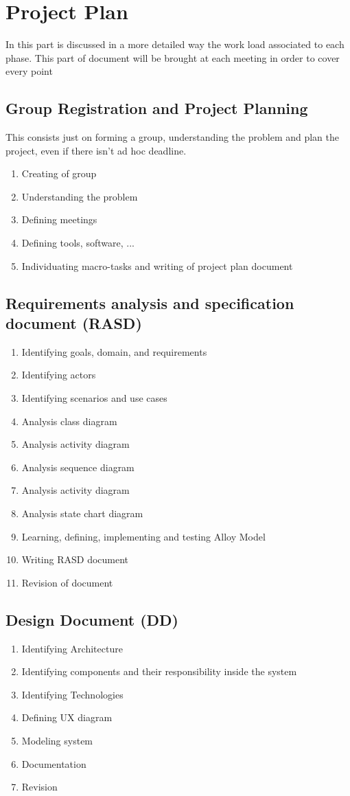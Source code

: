 \documentclass[12pt]{book}
\begin{document}
\chapter{Project Plan }
In this part is discussed in a more detailed way the work load associated to each phase. 
This part of document will be brought at each meeting in order to cover every point
\section{Group Registration and Project Planning}
This consists just on forming a group, understanding the problem and plan the project, even if there isn't ad hoc deadline. 
\begin{enumerate}
	\item Creating of group 
	\item Understanding the problem
	\item Defining meetings
	\item Defining tools, software, ...
	\item Individuating macro-tasks and writing of project plan document
\end{enumerate}
\section{Requirements analysis and specification document (RASD)}
\begin{enumerate}
	\item Identifying goals, domain, and requirements 
	\item Identifying actors
	\item Identifying scenarios and use cases 
	\item Analysis class diagram
	\item Analysis activity diagram
	\item Analysis sequence diagram
	\item Analysis activity diagram
	\item Analysis state chart diagram
	\item Learning, defining, implementing and testing Alloy Model
	\item Writing RASD document
	\item Revision of document
\end{enumerate}
\section{Design Document (DD)}
\begin{enumerate}
	\item Identifying Architecture 
	\item Identifying components and their responsibility inside the system
	\item Identifying Technologies 
	\item Defining UX diagram
	\item Modeling system 
	\item Documentation
	\item Revision
\end{enumerate}
\end{document}
